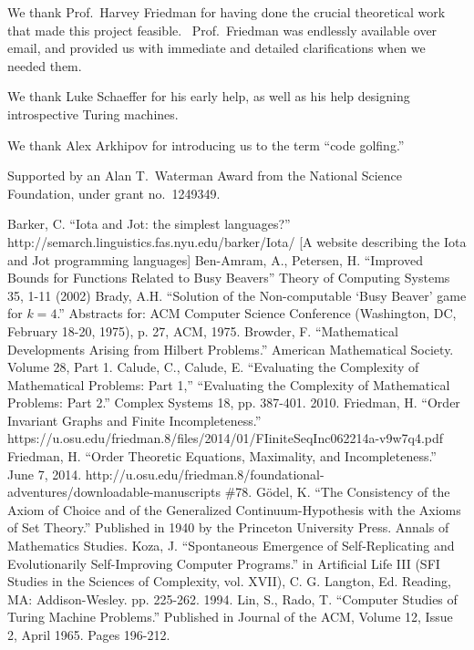 \documentclass[11pt]{article}
\begin{document}
We thank Prof.\ Harvey Friedman for having done the crucial theoretical work that made this project feasible. \ Prof.\ Friedman was endlessly available over email, and provided us with immediate and detailed clarifications when we needed them.

We thank Luke Schaeffer for his early help, as well as his help designing introspective Turing machines.

We thank Alex Arkhipov for introducing us to the term ``code golfing.''

Supported by an Alan T.\ Waterman Award from the National Science Foundation, under grant no.\ 1249349.

\begin{thebibliography}{100}
 Barker, C. ``Iota and Jot: the simplest languages?'' http://semarch.linguistics.fas.nyu.edu/barker/Iota/ [A website describing the Iota and Jot programming languages]
 Ben-Amram, A., Petersen, H. ``Improved Bounds for Functions Related to Busy Beavers'' Theory of Computing Systems 35, 1-11 (2002)
 Brady, A.H. ``Solution of the Non-computable `Busy Beaver' game for $k=4$.'' Abstracts for: ACM Computer Science Conference (Washington, DC, February 18-20, 1975), p. 27, ACM, 1975.
 Browder, F. ``Mathematical Developments Arising from Hilbert Problems.'' American Mathematical Society. Volume 28, Part 1.
 Calude, C., Calude, E. ``Evaluating the Complexity of Mathematical Problems: Part 1,'' ``Evaluating the Complexity of Mathematical Problems: Part 2.'' Complex Systems 18, pp. 387-401. 2010.
 Friedman, H. ``Order Invariant Graphs and Finite Incompleteness.'' https://u.osu.edu/friedman.8/files/2014/01/FIiniteSeqInc062214a-v9w7q4.pdf
 Friedman, H. ``Order Theoretic Equations, Maximality, and Incompleteness.'' June 7, 2014. http://u.osu.edu/friedman.8/foundational-adventures/downloadable-manuscripts \#78.
 G\"odel, K. ``The Consistency of the Axiom of Choice and of the Generalized Continuum-Hypothesis with the Axioms of Set Theory.'' Published in 1940 by the Princeton University Press. Annals of Mathematics Studies.
 Koza, J. ``Spontaneous Emergence of Self-Replicating and Evolutionarily Self-Improving Computer Programs.'' in Artificial Life III (SFI Studies in the Sciences of Complexity, vol. XVII), C. G. Langton, Ed. Reading, MA: Addison-Wesley. pp. 225-262. 1994.
 Lin, S., Rado, T. ``Computer Studies of Turing Machine Problems.'' Published in Journal of the ACM, Volume 12, Issue 2, April 1965. Pages 196-212.

\end{thebibliography}
\end{document}
